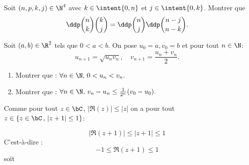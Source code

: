 \documentclass[a4paper, 11pt,reqno]{article}
\begin{document}
\begin{exercice} Soit $(n,p,k,j)\in\N^4$ avec $k\in\intent{0,n}$ et $j\in\intent{0,k}$. Montrer que $$\ddp\binom{n}{k}\binom{k}{j}=\ddp\binom{n}{j}\ddp\binom{n-j}{n-k}.$$
\end{exercice}


\begin{exercice}
Soit $(a, b) \in \R^2$ tels que $0<a<b.$ On pose $u_0=a, v_0=b$ et pour tout $n\in \N$:
$$ u_{n+1} =\sqrt{u_n v_n}, \quad v_{n+1} = \frac{u_n +v_n}{2}.$$
\begin{enumerate}
\item Montrer que :  $\forall n\in \N, \, 0<u_n<v_n.$
\item Montrer que :  $\forall n\in \N, \, v_n-u_n\leq \frac{1}{2^n}(v_0-u_0).$
\end{enumerate}
\end{exercice}




\begin{correction}
 Comme pour tout $z\in \bC$, $|\Re(z)| \leq |z|$ on a pour tout $z\in \{ z\in \bC\, , \, |z+1|\leq 1\}$:
 
$$|\Re(z+1)| \leq |z+1|\leq 1$$
C'est-à-dire :
$$-1\leq \Re(z+1)\leq 1$$
soit 
\begin{center}


\end{center}
\end{correction}
\end{document}

